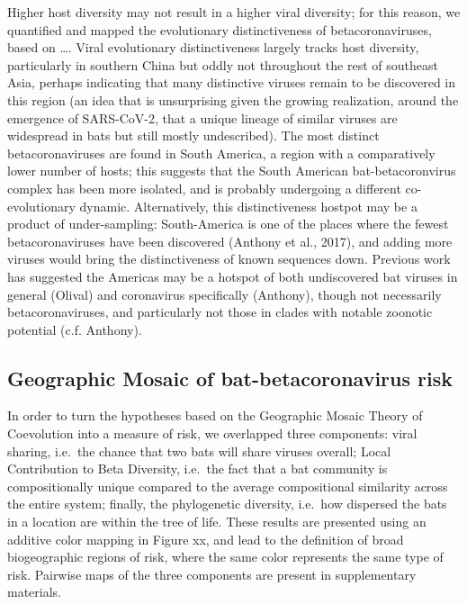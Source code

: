 \documentclass[11pt]{article}
\begin{document}
Higher host diversity may not result in a higher viral diversity; for
this reason, we quantified and mapped the evolutionary distinctiveness
of betacoronaviruses, based on \ldots. Viral evolutionary
distinctiveness largely tracks host diversity, particularly in southern
China but oddly not throughout the rest of southeast Asia, perhaps
indicating that many distinctive viruses remain to be discovered in this
region (an idea that is unsurprising given the growing realization,
around the emergence of SARS-CoV-2, that a unique lineage of similar
viruses are widespread in bats but still mostly undescribed). The most
distinct betacoronaviruses are found in South America, a region with a
comparatively lower number of hosts; this suggests that the South
American bat-betacoronvirus complex has been more isolated, and is
probably undergoing a different co-evolutionary dynamic. Alternatively,
this distinctiveness hostpot may be a product of under-sampling:
South-America is one of the places where the fewest betacoronaviruses
have been discovered (Anthony et al., 2017), and adding more viruses
would bring the distinctiveness of known sequences down. Previous work
has suggested the Americas may be a hotspot of both undiscovered bat
viruses in general (Olival) and coronavirus specifically (Anthony),
though not necessarily betacoronaviruses, and particularly not those in
clades with notable zoonotic potential (c.f. Anthony).

\hypertarget{geographic-mosaic-of-bat-betacoronavirus-risk}{%
\subsection{Geographic Mosaic of bat-betacoronavirus
risk}\label{geographic-mosaic-of-bat-betacoronavirus-risk}}

In order to turn the hypotheses based on the Geographic Mosaic Theory of
Coevolution into a measure of risk, we overlapped three components:
viral sharing, i.e.~the chance that two bats will share viruses overall;
Local Contribution to Beta Diversity, i.e.~the fact that a bat community
is compositionally unique compared to the average compositional
similarity across the entire system; finally, the phylogenetic
diversity, i.e.~how dispersed the bats in a location are within the tree
of life. These results are presented using an additive color mapping in
Figure xx, and lead to the definition of broad biogeographic regions of
risk, where the same color represents the same type of risk. Pairwise
maps of the three components are present in supplementary materials.
\end{document}
